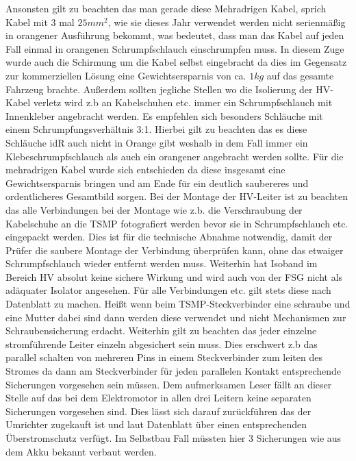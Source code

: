 Ansonsten gilt zu beachten das man gerade diese Mehradrigen Kabel, sprich Kabel mit 3 mal \ensuremath{25 mm^2}, wie sie dieses Jahr verwendet werden nicht serienmäßig in orangener Ausführung bekommt, was bedeutet, dass man das Kabel auf jeden Fall einmal in orangenen Schrumpfschlauch einschrumpfen muss. In diesem Zuge wurde auch die Schirmung um die Kabel selbst eingebracht da dies im Gegensatz zur kommerziellen Lösung eine Gewichtsersparnis von ca. \ensuremath{1 kg} auf das gesamte Fahrzeug brachte. Außerdem sollten jegliche Stellen wo die Isolierung der \ac{HV}-Kabel verletz wird z.b an Kabelschuhen etc. immer ein Schrumpfschlauch mit Innenkleber angebracht werden. Es empfehlen sich besonders Schläuche mit einem Schrumpfungsverhältnis 3:1. Hierbei gilt zu beachten das es diese Schläuche \ac{idR} auch nicht in Orange gibt weshalb in dem Fall immer ein Klebeschrumpfschlauch als auch ein orangener angebracht werden sollte. Für die mehradrigen Kabel wurde sich entschieden da diese insgesamt eine Gewichtsersparnis bringen und am Ende für ein deutlich saubereres und ordentlicheres Gesamtbild sorgen. Bei der Montage der \ac{HV}-Leiter ist zu beachten das alle Verbindungen bei der Montage wie z.b. die Verschraubung der Kabelschuhe an die \ac{TSMP} fotografiert werden bevor sie in Schrumpfschlauch etc. eingepackt werden. Dies ist für die technische Abnahme notwendig, damit der Prüfer die saubere Montage der Verbindung überprüfen kann, ohne das etwaiger Schrumpfschlauch wieder entfernt werden muss. Weiterhin hat Isoband im Bereich \ac{HV} absolut keine sichere Wirkung und wird auch von der \ac{FSG} nicht als adäquater Isolator angesehen. Für alle Verbindungen etc. gilt stets diese nach Datenblatt zu machen. Heißt wenn beim \ac{TSMP}-Steckverbinder eine schraube und eine Mutter dabei sind dann werden diese verwendet und nicht Mechanismen zur Schraubensicherung erdacht. Weiterhin gilt zu beachten das jeder einzelne stromführende Leiter einzeln abgesichert sein muss. Dies erschwert z.b das parallel schalten von mehreren Pins in einem Steckverbinder zum leiten des Stromes da dann am Steckverbinder für jeden parallelen Kontakt entsprechende Sicherungen vorgesehen sein müssen. Dem aufmerksamen Leser fällt an dieser Stelle auf das bei dem Elektromotor in allen drei Leitern keine separaten Sicherungen vorgesehen sind. Dies lässt sich darauf zurückführen das der Umrichter zugekauft ist und laut Datenblatt über einen entsprechenden Überstromschutz verfügt. Im Selbstbau Fall müssten hier 3 Sicherungen wie aus dem Akku bekannt verbaut werden. 
 
